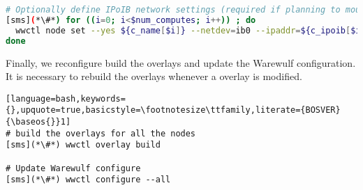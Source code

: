 \begin{lstlisting}[language=bash,keywords={},upquote=true,basicstyle=\footnotesize\ttfamily]
# Optionally define IPoIB network settings (required if planning to mount Lustre/BeeGFS over IB)
[sms](*\#*) for ((i=0; i<$num_computes; i++)) ; do
  wwctl node set --yes ${c_name[$i]} --netdev=ib0 --ipaddr=${c_ipoib[$i]} --netmask=${ipoib_netmask}
done
\end{lstlisting}
\fi

Finally, we reconfigure build the overlays and update the Warewulf configuration.
It is necessary to rebuild the overlays whenever a overlay is modified.

\begin{lstlisting}[language=bash,keywords={},upquote=true,basicstyle=\footnotesize\ttfamily,literate={BOSVER}{\baseos{}}1]
# build the overlays for all the nodes
[sms](*\#*) wwctl overlay build

# Update Warewulf configure 
[sms](*\#*) wwctl configure --all
\end{lstlisting}
